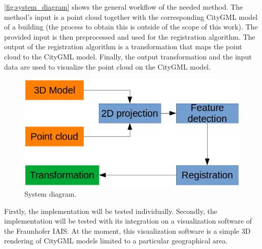         \autoref{fig:system_diagram} shows the general workflow of the needed method.
        The method’s input is a point cloud together with the corresponding CityGML model of a building  
        (the process to obtain this is outside of the scope of this work).
        The provided input is then preprocessed and used for the registration algorithm.
        The output of the registration algorithm is a transformation that maps the point cloud to the CityGML model.
        Finally, the output transformation and the input data are used to visualize the point cloud on the CityGML model.

        \begin{figure}[H]
            \centering
            \includegraphics[scale=0.5]{images/RegistrationProcess}
            \caption{System diagram.}
            \label{fig:system_diagram}
        \end{figure}

        Firstly, the implementation will be tested individually. 
        Secondly, the implementation will be tested with its integration on a visualization software of the Fraunhofer IAIS. 
        At the moment, this visualization software is a simple 3D rendering of CityGML models limited to a particular geographical area.



